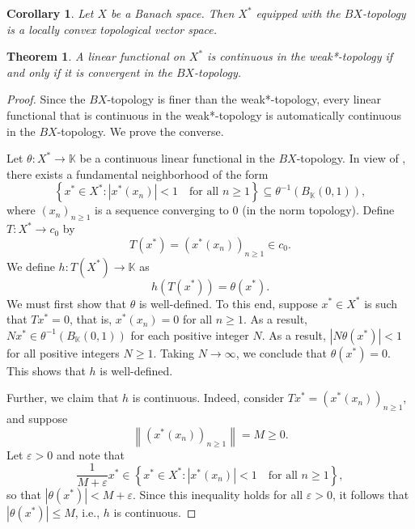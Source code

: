 \documentclass[11pt]{article}
\theoremstyle{thmstyle}
\newtheorem{theorem}{Theorem}[section]
\theoremstyle{defstyle}
\newtheorem*{corollary}{Corollary}
\newcommand{\R}{\mathbb{R}}
\newcommand{\bbC}{\mathbb{C}}
\newcommand{\K}{\mathbb{K}} %
\renewcommand{\le}{\leqslant}
\renewcommand{\ge}{\geqslant}
\begin{document}
\begin{corollary}
    Let $X$ be a Banach space. Then $X^\ast$ equipped with the $BX$-topology is a locally convex topological vector space.
\end{corollary}

\begin{theorem}
    A linear functional on $X^\ast$ is continuous in the weak*-topology if and only if it is convergent in the $BX$-topology.
\end{theorem}
\begin{proof}
    Since the $BX$-topology is finer than the weak*-topology, every linear functional that is continuous in the weak*-topology is automatically continuous in the $BX$-topology. We prove the converse.

    Let $\theta\colon X^\ast\to\K$ be a continuous linear functional in the $BX$-topology. In view of , there exists a fundamental neighborhood of the form 
    \begin{equation*}
        \left\{x^\ast\in X^\ast\colon |x^\ast(x_n)| < 1\quad\text{for all }n\ge 1\right\}\subseteq\theta^{-1}\left(B_{\K}\left(0, 1\right)\right),
    \end{equation*}
    where $(x_n)_{n\ge 1}$ is a sequence converging to $0$ (in the norm topology). Define $T\colon X^\ast\to c_0$ by 
    \begin{equation*}
        T(x^\ast) = \left(x^\ast(x_n)\right)_{n\ge 1}\in c_0.
    \end{equation*}
    We define $h\colon T\left(X^\ast\right)\to\K$ as 
    \begin{equation*}
        h\left(T(x^\ast)\right) = \theta(x^\ast).
    \end{equation*}
    We must first show that $\theta$ is well-defined. To this end, suppose $x^\ast\in X^\ast$ is such that $T x^\ast = 0$, that is, $x^\ast(x_n) = 0$ for all $n\ge 1$. As a result, $Nx^\ast\in\theta^{-1}\left(B_{\K}\left(0, 1\right)\right)$ for each positive integer $N$. As a result, $|N\theta(x^\ast)| < 1$ for all positive integers $N\ge 1$. Taking $N\to\infty$, we conclude that $\theta(x^\ast) = 0$. This shows that $h$ is well-defined. 

    Further, we claim that $h$ is continuous. Indeed, consider $Tx^\ast = \left(x^\ast(x_n)\right)_{n\ge 1}$, and suppose $$\left\|\left(x^\ast(x_n)\right)_{n\ge 1}\right\| = M\ge 0.$$ Let $\varepsilon > 0$ and note that 
    \begin{equation*}
        \frac{1}{M + \varepsilon}x^\ast\in\left\{x^\ast\in X^\ast\colon |x^\ast(x_n)| < 1\quad\text{for all }n\ge 1\right\},
    \end{equation*}
    so that $|\theta(x^\ast)| < M + \varepsilon$. Since this inequality holds for all $\varepsilon > 0$, it follows that $|\theta(x^\ast)|\le M$, i.e., $h$ is continuous.


\end{proof}
\end{document}
